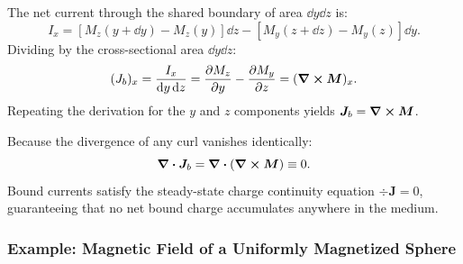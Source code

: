 The net current through the shared boundary of area $\dd{y}\dd{z}$ is:
\begin{equation}
    I_x = \left[ M_z(y + \dd{y}) - M_z(y) \right]\dd{z} - \left[ M_y(z + \dd{z}) - M_y(z) \right]\dd{y}.
\end{equation}
Dividing by the cross-sectional area $\dd{y}\dd{z}$:
\begin{equation}
    (J_b)_x = \frac{I_x}{\dd{y}\dd{z}} = \pdv{M_z}{y} - \pdv{M_y}{z} = (\curl \bm{M})_x.
\end{equation}
Repeating the derivation for the $y$ and $z$ components yields $\bm{J}_b = \curl \bm{M}$.

\begin{remark}
    Because the divergence of any curl vanishes identically:
    \begin{equation}
        \div \bm{J}_b = \div(\curl \bm{M}) \equiv 0.
    \end{equation}
    Bound currents satisfy the steady-state charge continuity equation $\div \bm{J} = 0$, guaranteeing that no net bound charge accumulates anywhere in the medium.
\end{remark}

\subsubsection{Example: Magnetic Field of a Uniformly Magnetized Sphere}

